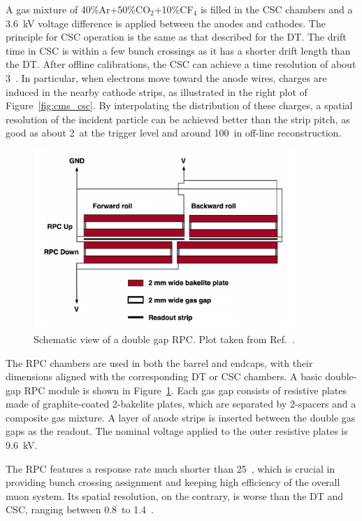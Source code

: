A gas mixture of 40\%Ar+50\%CO$_{2}$+10\%CF$_{4}$ is filled in the CSC chambers and 
a 3.6~kV voltage difference is applied between the anodes and cathodes.
The principle for CSC operation is the same as that described for the DT.
The drift time in CSC is within a few bunch crossings as it has a shorter drift length than the DT.
After offline calibrations, the CSC can achieve a time resolution of about 3~\ns.
In particular, when electrons move toward the anode wires, charges are induced in the nearby cathode strips, as illustrated in the right plot of Figure~\ref{fig:cms_csc}.
By interpolating the distribution of these charges, a spatial resolution of the incident particle can be achieved better than the strip pitch,
as good as about 2~\mm at the trigger level and around 100~\mum in off-line reconstruction.  

\begin{figure}[!htb]
    \centering
    \captionsetup{justification=centering}
    \includegraphics[width=0.90\textwidth]{pics/LHC_CMS/RPC.png}
    \caption{Schematic view of a double gap RPC.
             Plot taken from Ref.~\cite{collaboration_2013}.}
    \label{fig:cms_rpc}
\end{figure}

The RPC chambers are used in both the barrel and endcaps, with their dimensions aligned with the corresponding DT or CSC chambers.
A basic double-gap RPC module is shown in Figure~\ref{fig:cms_rpc}. 
Each gas gap consists of resistive plates made of graphite-coated 2-\mm bakelite plates, 
which are separated by 2-\mm spacers and a composite gas mixture.
A layer of anode strips is inserted between the double gas gaps as the readout.
The nominal voltage applied to the outer resistive plates is 9.6~kV.

The RPC features a response rate much shorter than 25~\ns,
which is crucial in providing bunch crossing assignment and keeping high efficiency of the overall muon system.
Its spatial resolution, on the contrary, is worse than the DT and CSC, ranging between 0.8~\cm to 1.4~\cm.

